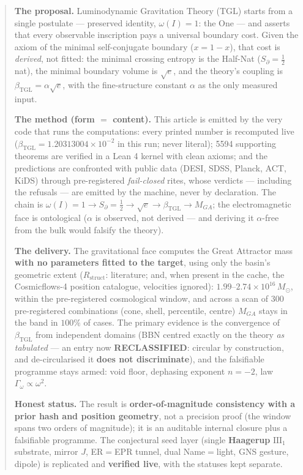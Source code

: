 \documentclass[11pt]{article}
\newcommand{\bTGL}{\beta_{\mathrm{TGL}}}\newcommand{\Msun}{M_{\odot}}\newcommand{\TGL}{\mathrm{TGL}}
\theoremstyle{definition}\newtheorem{deriv}{Derivation}
\begin{document}
\begin{abstract}

\textbf{The proposal.} Luminodynamic Gravitation Theory (TGL) starts from a single postulate --- preserved identity, $\omega(I)=1$: the One --- and asserts that every observable inscription pays a universal boundary cost. Given the axiom of the minimal self-conjugate boundary ($x=1-x$), that cost is \emph{derived}, not fitted: the minimal crossing entropy is the Half-Nat ($S_\partial=\tfrac12$ nat), the minimal boundary volume is $\sqrt e$, and the theory's coupling is $\bTGL=\alpha\sqrt e$, with the fine-structure constant $\alpha$ as the only measured input.

\textbf{The method (form $=$ content).} This article is emitted by the very code that runs the computations: every printed number is recomputed live ($\bTGL=1.20313004\times10^{-2}$ in this run; never literal); 5594 supporting theorems are verified in a Lean 4 kernel with clean axioms; and the predictions are confronted with public data (DESI, SDSS, Planck, ACT, KiDS) through pre-registered \emph{fail-closed} rites, whose verdicts --- including the refusals --- are emitted by the machine, never by declaration. The chain is $\omega(I)=1\to S_\partial=\tfrac12\to\sqrt e\to\bTGL\to M_{GA}$; the electromagnetic face is ontological ($\alpha$ is observed, not derived --- and deriving it $\alpha$-free from the bulk would falsify the theory).

\textbf{The delivery.} The gravitational face computes the Great Attractor mass \textbf{with no parameters fitted to the target}, using only the basin's geometric extent ($R_{\mathrm{struct}}$: literature; and, when present in the cache, the Cosmicflows-4 position catalogue, velocities ignored): $1.99$--$2.74\times10^{16}\,\Msun$, within the pre-registered cosmological window, and across a scan of $300$ pre-registered combinations (cone, shell, percentile, centre) $M_{GA}$ stays in the band in $100\%$ of cases. The primary evidence is the convergence of $\bTGL$ from independent domains (BBN centred exactly on the theory \emph{as tabulated} --- an entry now \textbf{RECLASSIFIED}: circular by construction, and de-circularised it \textbf{does not discriminate}), and the falsifiable programme stays armed: void floor, dephasing exponent $n=-2$, law $\Gamma_\omega\propto\omega^2$.

\textbf{Honest status.} The result is \textbf{order-of-magnitude consistency with a prior hash and position geometry}, not a precision proof (the window spans two orders of magnitude); it is an auditable internal closure plus a falsifiable programme. The conjectural seed layer (single \textbf{Haagerup} $\mathrm{III}_1$ substrate, mirror $J$, ER$=$EPR tunnel, dual Name$=$light, GNS gesture, dipole) is replicated and \textbf{verified live}, with the statuses kept separate.

\end{abstract}
\end{document}
